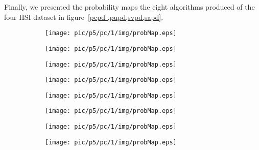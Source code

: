 \documentclass{article}
\begin{document}
	Finally, we presented the probability maps the eight algorithms produced of the four HSI dataset in
	figure~\ref{pcpd ,pupd,svpd,sapd}.
	\begin{figure}
		\begin{subfigure}{0.125\textwidth}
			\texttt{[image: pic/p5/pc/1/img/probMap.eps]}
			\caption{}
		\end{subfigure}
		\begin{subfigure}{0.125\textwidth}
			\texttt{[image: pic/p5/pc/1/img/probMap.eps]}
			\caption{}
		\end{subfigure}
		\begin{subfigure}{0.125\textwidth}
			\texttt{[image: pic/p5/pc/1/img/probMap.eps]}
			\caption{}
		\end{subfigure}
		\begin{subfigure}{0.125\textwidth}
			\texttt{[image: pic/p5/pc/1/img/probMap.eps]}
			\caption{}
		\end{subfigure}
		\begin{subfigure}{0.125\textwidth}
			\texttt{[image: pic/p5/pc/1/img/probMap.eps]}
			\caption{}
		\end{subfigure}
		\begin{subfigure}{0.125\textwidth}
			\texttt{[image: pic/p5/pc/1/img/probMap.eps]}
			\caption{}
		\end{subfigure}
		\begin{subfigure}{0.125\textwidth}
			\texttt{[image: pic/p5/pc/1/img/probMap.eps]}
			\caption{}
		\end{subfigure}
		\begin{subfigure}{0.125\textwidth}
			\texttt{[image: pic/p5/pc/1/img/probMap.eps]}
			\caption{}
		\end{subfigure}
		\label{pcpd}
	\end{figure}
\end{document}
